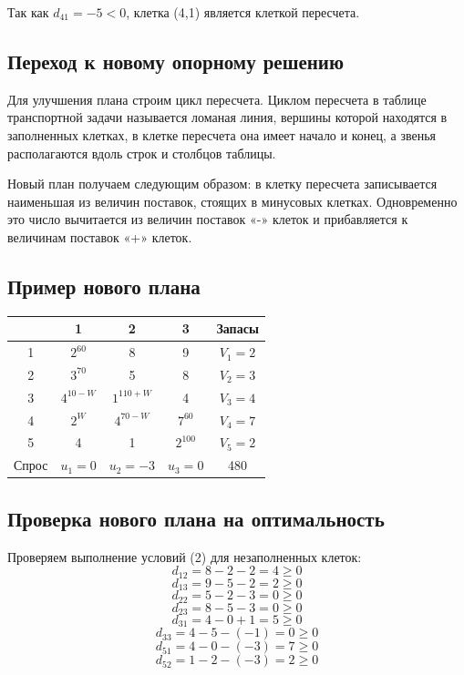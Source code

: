 \documentclass[17pt]{extarticle}
\begin{document}
Так как \( d_{41} = -5 < 0 \), клетка (4,1) является клеткой пересчета.

\subsection{Переход к новому опорному решению}

Для улучшения плана строим цикл пересчета. Циклом пересчета в таблице транспортной задачи называется ломаная линия, вершины которой находятся в заполненных клетках, в клетке пересчета она имеет начало и конец, а звенья располагаются вдоль строк и столбцов таблицы.

Новый план получаем следующим образом: в клетку пересчета записывается наименьшая из величин поставок, стоящих в минусовых клетках. Одновременно это число вычитается из величин поставок «-» клеток и прибавляется к величинам поставок «+» клеток.

\subsection{Пример нового плана}

\begin{longtable}{|c|c|c|c|c|}
    \hline
          & 1              & 2               & 3             & Запасы        \\
    \hline
    1     & $2^{60}$       & 8               & 9             & \( V_1 = 2 \) \\
    \hline
    2     & $3^{70}$       & 5               & 8             & \( V_2 = 3 \) \\
    \hline
    3     & \( 4^{10-W} \) & \( 1^{110+W} \) & 4             & \( V_3 = 4 \) \\
    \hline
    4     & \( 2^W \)      & \( 4^{70-W} \)  & $7^{60}$      & \( V_4 = 7 \) \\
    \hline
    5     & 4              & 1               & $2^{100}$     & \( V_5 = 2 \) \\
    \hline
    Спрос & \( u_1 = 0 \)  & \( u_2 = -3 \)  & \( u_3 = 0 \) & 480           \\
    \hline
\end{longtable}

\subsection{Проверка нового плана на оптимальность}
Проверяем выполнение условий (2) для незаполненных клеток:
\[
    d_{12} = 8 - 2 - 2 = 4 \geq 0
\]
\[
    d_{13} = 9 - 5 - 2 = 2 \geq 0
\]
\[
    d_{22} = 5 - 2 - 3 = 0 \geq 0
\]
\[
    d_{23} = 8 - 5 - 3 = 0 \geq 0
\]
\[
    d_{31} = 4 - 0 + 1 = 5 \geq 0
\]
\[
    d_{33} = 4 - 5 - (-1) = 0 \geq 0
\]
\[
    d_{51} = 4 - 0 - (-3) = 7 \geq 0
\]
\[
    d_{52} = 1 - 2 - (-3) = 2 \geq 0
\]
\end{document}
